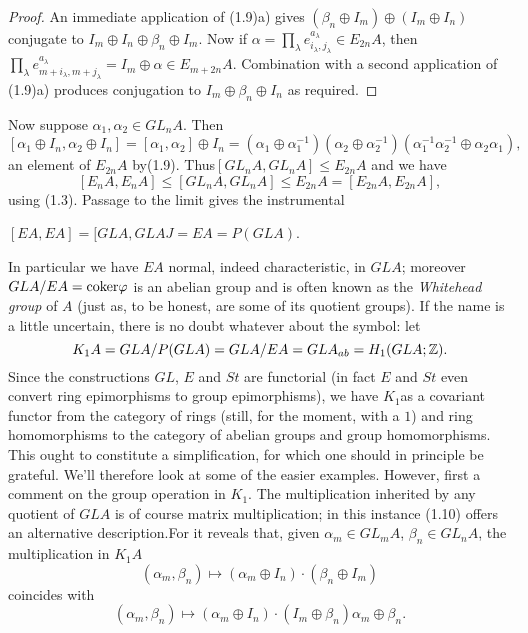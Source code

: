 \begin{proof}
An immediate application of (1.9)a) gives $(\beta_n\oplus I_m)\oplus (I_m\oplus I_n)$ conjugate to
$I_m\oplus I_n \oplus \beta_n\oplus I_m $. Now if $\alpha =\prod_\lambda e_{i_\lambda,j_\lambda}^{a_\lambda}\in E_{2n}A$, then $\prod_\lambda e_{m+i_\lambda,m+j_\lambda}^{a_\lambda}=I_m\oplus \alpha \in E_{m+2n}A$. Combination with a second application of (1.9)a) produces conjugation to $I_m\oplus\beta_n \oplus I_n$ as required.
\end{proof}

Now suppose $\alpha_1,\alpha_2\in GL_nA$. Then
\[[\alpha_1\oplus I_n,\alpha_2\oplus I_n]=[\alpha_1,\alpha_2]\oplus I_n=(\alpha_1\oplus \alpha_1^{-1})(\alpha_2\oplus \alpha_2^{-1})(\alpha_1^{-1}\alpha_2^{-1}\oplus \alpha_2\alpha_1 ),\]
an element of $E_{2n}A$ by(1.9). Thus$[GL_nA,GL_nA]\leqslant E_{2n}A$ and we have
\[[E_nA,E_nA]\leqslant [GL_nA,GL_nA]\leqslant E_{2n}A=[E_{2n}A,E_{2n}A],\]
using (1.3). Passage to the limit gives the instrumental
\begin{lemma}
$[EA,EA]=[GLA,GLAJ=EA=P(GLA)$.
\end{lemma}

In particular we have $EA$ normal, indeed characteristic, in $GLA$; moreover $GLA/EA=\mathrm{coker} \varphi$ is an abelian group and is often known as the {\em Whitehead group} of $A$ (just as, to be honest, are some of its quotient groups). If the name is a little uncertain, there is no doubt whatever about the symbol: let
\[K_1A=GLA/P(GLA)=GLA/EA=GLA_{ab}=H_1(GLA;\mathbb{Z}).\]
Since the constructions $GL$, $E$ and $St$ are functorial (in fact $E$ and $St$ even convert ring epimorphisms to group epimorphisms), we have $K_1$as a covariant functor from the category of rings (still, for the moment, with a $1$) and ring homomorphisms to the category of abelian groups and group homomorphisms. This ought to constitute a simplification, for which one should in principle be grateful. We'll therefore look at some of the easier examples. However, first a comment on the group operation in $K_1$. The multiplication inherited by any quotient of $GLA$ is of course matrix multiplication; in this instance (1.10) offers an alternative description.For it reveals that, given $\alpha_m \in GL_m A$, $\beta_n\in GL_n A$, the multiplication in $K_1A$
\[(\alpha_m,\beta_n)\mapsto (\alpha_m\oplus I_n)\cdot(\beta_n\oplus I_m)\]
coincides with
\[(\alpha_m,\beta_n)\mapsto (\alpha_m\oplus I_n)\cdot(I_m\oplus \beta_n )\alpha_m\oplus\beta_n.\]

